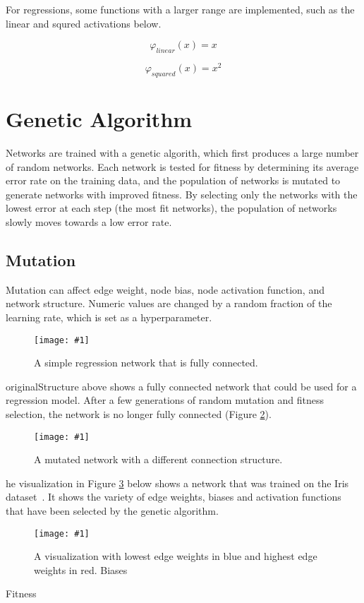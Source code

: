 \documentclass[twocolumn]{article}
\newcommand\fig[5]{
	\begin{figure}[H]
		\begin{center}\texttt{[image: \#1]}\end{center}
		\caption{#4}\label{fig:#2}
	\end{figure}
}
\newcommand\figRef[1]{Figure \ref{fig:#1}\xspace}
\begin{document}
For regressions, some functions with a larger range are implemented, such as the linear and squred activations below.

$$\varphi_{linear}(x) = x$$

$$\varphi_{squared}(x) = x^2$$

\section{Genetic Algorithm}
Networks are trained with a genetic algorith, which first produces a large number of random networks. Each network is tested for fitness by determining its average error rate on the training data, and the population of networks is mutated to generate networks with improved fitness. By selecting only the networks with the lowest error at each step (the most fit networks), the population of networks slowly moves towards a low error rate.

\subsection{Mutation}

Mutation can affect edge weight, node bias, node activation function, and network structure. Numeric values are changed by a random fraction of the learning rate, which is set as a hyperparameter. 

\fig{images/originalRegression.png}{originalStructure}{0.2}{
A simple regression network that is fully connected.
}

\figRef{originalStructure} above shows a fully connected network that could be used for a regression model. After a few generations of random mutation and fitness selection, the network is no longer fully connected (\figRef{mutatedStructure}).

\fig{images/mutatedRegression.png}{mutatedStructure}{0.2}{
A mutated network with a different connection structure.
}

The visualization in \figRef{enhancedVis} below shows a network that was trained on the Iris dataset~\cite{IrisDataset}. It shows the variety of edge weights, biases and activation functions that have been selected by the genetic algorithm.

\fig{images/enhancedVisualization.png}{enhancedVis}{0.2}{
A visualization with lowest edge weights in blue and highest edge weights in red. Biases 
}

\subsection{Fitness}
\end{document}
